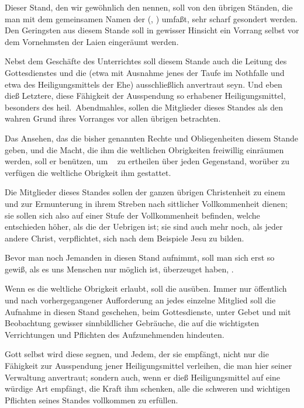 \begin{aufza}
\item Dieser Stand, den wir gewöhnlich den  nennen, soll von den übrigen Ständen, die man mit dem gemeinsamen Namen der  (, ) umfaßt, sehr scharf gesondert werden. Den Geringsten aus diesem Stande soll in gewisser Hinsicht ein Vorrang selbst vor dem Vornehmsten der Laien eingeräumt werden.
\item Nebst dem Geschäfte des Unterrichtes soll diesem Stande auch die Leitung des Gottesdienstes und die  (etwa mit Ausnahme jenes der Taufe im Nothfalle und etwa des Heiligungsmittels der Ehe) ausschließlich anvertraut seyn. Und eben dieß Letztere, diese Fähigkeit der Ausspendung so erhabener Heiligungsmittel, besonders des heil.\ Abendmahles, sollen die Mitglieder dieses Standes als den wahren Grund ihres Vorranges vor allen übrigen betrachten.
\item Das Ansehen, das die bisher genannten Rechte und Obliegenheiten diesem Stande geben, und die Macht, die ihm die weltlichen Obrigkeiten freiwillig einräumen werden, soll er benützen, um ~ zu ertheilen über jeden Gegenstand, worüber zu verfügen die weltliche Obrigkeit ihm gestattet.
\item Die Mitglieder dieses Standes sollen der ganzen übrigen Christenheit zu einem  und zur Ermunterung in ihrem Streben nach sittlicher Vollkommenheit dienen; sie sollen sich also auf einer Stufe der Vollkommenheit befinden, welche entschieden höher, als die der Uebrigen ist; sie sind auch mehr noch, als jeder andere Christ, verpflichtet, sich nach dem Beispiele Jesu zu bilden.
\item Bevor man noch Jemanden in diesen Stand aufnimmt, soll man sich erst so gewiß, als es uns Menschen nur möglich ist, überzeuget haben, .
\item Wenn es die weltliche Obrigkeit erlaubt, soll die  ausüben. Immer nur öffentlich und nach vorhergegangener Aufforderung an jedes einzelne Mitglied soll die Aufnahme in diesen Stand geschehen, beim Gottesdienste, unter Gebet und mit Beobachtung gewisser sinnbildlicher Gebräuche, die auf die wichtigsten Verrichtungen und Pflichten des Aufzunehmenden hindeuten.
\item Gott selbst wird diese  segnen, und Jedem, der sie empfängt, nicht nur die Fähigkeit zur Ausspendung jener Heiligungsmittel verleihen, die man hier seiner Verwaltung anvertraut; sondern auch, wenn er dieß Heiligungsmittel auf eine würdige Art empfängt, die Kraft ihm schenken, alle die schweren und wichtigen Pflichten seines Standes vollkommen zu erfüllen.

\end{aufza}
